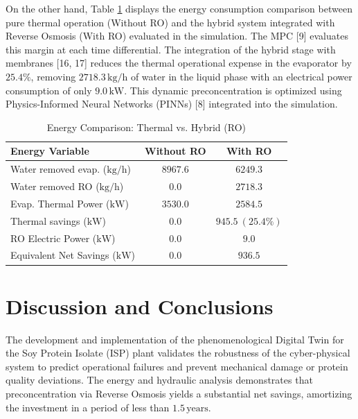 \documentclass[10pt,letterpaper,twocolumn]{article}
\begin{document}
On the other hand, Table \ref{tab:energy_comparison} displays the energy consumption comparison between pure thermal operation (Without RO) and the hybrid system integrated with Reverse Osmosis (With RO) evaluated in the simulation. The MPC [9] evaluates this margin at each time differential. The integration of the hybrid stage with membranes [16, 17] reduces the thermal operational expense in the evaporator by $25.4\%$, removing $2718.3\,\text{kg/h}$ of water in the liquid phase with an electrical power consumption of only $9.0\,\text{kW}$. This dynamic preconcentration is optimized using Physics-Informed Neural Networks (PINNs) [8] integrated into the simulation.

\begin{table}[t]
\centering
\caption{Energy Comparison: Thermal vs. Hybrid (RO)}
\label{tab:energy_comparison}
\begin{tabular}{lcc}
\toprule
Energy Variable & Without RO & With RO \\
\midrule
Water removed evap. ($\text{kg/h}$) & $8967.6$ & $6249.3$ \\
Water removed RO ($\text{kg/h}$) & $0.0$ & $2718.3$ \\
Evap. Thermal Power ($\text{kW}$) & $3530.0$ & $2584.5$ \\
Thermal savings ($\text{kW}$) & $0.0$ & $945.5\ (25.4\%)$ \\
RO Electric Power ($\text{kW}$) & $0.0$ & $9.0$ \\
Equivalent Net Savings ($\text{kW}$) & $0.0$ & $936.5$ \\
\bottomrule
\end{tabular}
\end{table}

\section{Discussion and Conclusions}

The development and implementation of the phenomenological Digital Twin for the Soy Protein Isolate (ISP) plant validates the robustness of the cyber-physical system to predict operational failures and prevent mechanical damage or protein quality deviations. The energy and hydraulic analysis demonstrates that preconcentration via Reverse Osmosis yields a substantial net savings, amortizing the investment in a period of less than $1.5\,\text{years}$.
\end{document}
